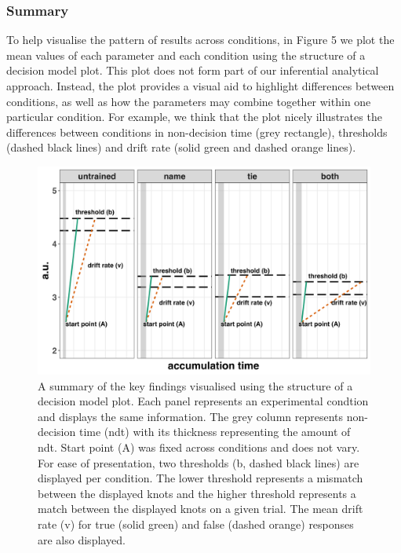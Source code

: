 \documentclass[
  man, donotrepeattitle,floatsintext]{apa6}
\begin{document}
\subsubsection{Summary}\label{summary}

To help visualise the pattern of results across conditions, in Figure 5 we plot the mean values of each parameter and each condition using the structure of a decision model plot. This plot does not form part of our inferential analytical approach. Instead, the plot provides a visual aid to highlight differences between conditions, as well as how the parameters may combine together within one particular condition. For example, we think that the plot nicely illustrates the differences between conditions in non-decision time (grey rectangle), thresholds (dashed black lines) and drift rate (solid green and dashed orange lines).



\begin{figure}[H]

{\centering \includegraphics[height=0.67\textheight,]{../figures/ea/lba_summary} 

}

\caption{A summary of the key findings visualised using the structure of a decision model plot. Each panel represents an experimental condtion and displays the same information. The grey column represents non-decision time (ndt) with its thickness representing the amount of ndt. Start point (A) was fixed across conditions and does not vary. For ease of presentation, two thresholds (b, dashed black lines) are displayed per condition. The lower threshold represents a mismatch between the displayed knots and the higher threshold represents a match between the displayed knots on a given trial. The mean drift rate (v) for true (solid green) and false (dashed orange) responses are also displayed.}\label{fig:lba-summary-plot}
\end{figure}
\end{document}
